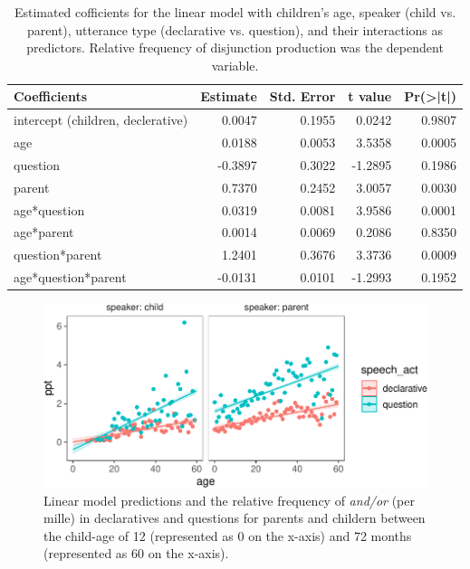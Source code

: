 \documentclass[
  ,man,floatsintext]{apa6}
\begin{document}
\begin{table}

\caption{\label{tab:study1coeftable}Estimated cofficients for the linear model with children's age, speaker (child vs. parent), utterance type (declarative vs. question), and their interactions as predictors. Relative frequency of disjunction production was the dependent variable.}
\centering
\fontsize{9}{11}\selectfont
\begin{tabular}[t]{l|r|r|r|r}
\hline
Coefficients & Estimate & Std. Error & t value & Pr(>|t|)\\
\hline
intercept (children, declerative) & 0.0047 & 0.1955 & 0.0242 & 0.9807\\
\hline
age & 0.0188 & 0.0053 & 3.5358 & 0.0005\\
\hline
question & -0.3897 & 0.3022 & -1.2895 & 0.1986\\
\hline
parent & 0.7370 & 0.2452 & 3.0057 & 0.0030\\
\hline
age*question & 0.0319 & 0.0081 & 3.9586 & 0.0001\\
\hline
age*parent & 0.0014 & 0.0069 & 0.2086 & 0.8350\\
\hline
question*parent & 1.2401 & 0.3676 & 3.3736 & 0.0009\\
\hline
age*question*parent & -0.0131 & 0.0101 & -1.2993 & 0.1952\\
\hline
\end{tabular}
\end{table}

\begin{figure}[H]

{\centering \includegraphics{figs/disjunctionPrediction-1} 

}

\caption{Linear model predictions and the relative frequency of \textit{and/or} (per mille) in declaratives and questions for parents and childern between the child-age of 12 (represented as 0 on the x-axis) and 72 months (represented as 60 on the x-axis).}\label{fig:disjunctionPrediction}
\end{figure}
\end{document}
